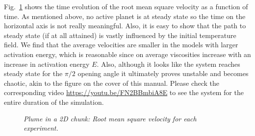 Fig.~\ref{fig:plume-diff-creep-vrms} shows the time evolution of the root mean square velocity as a function of time. 
As mentioned above, no active planet is at steady state so the time on the horizontal axis is not really meaningful. Also, it is easy to show that the path to steady state (if at all attained) is vastly influenced by the initial temperature field.
We find that the average velocities are smaller in the models with larger activation energy, which is reasonable since on average viscosities increase with an increase in activation energy $E$. Also, although it looks like the system reaches steady state for the $\pi/2$ opening angle it ultimately proves unstable and becomes chaotic, akin to the figure on the cover of this manual. Please check the corresponding video \url{https://youtu.be/FN2BBmbiA8E} to see the system for the entire duration of the simulation.

\begin{figure}
  \centering
  
  \caption{\it Plume in a 2D chunk: Root mean square velocity for each experiment.}
  \label{fig:plume-diff-creep-vrms}
\end{figure}

